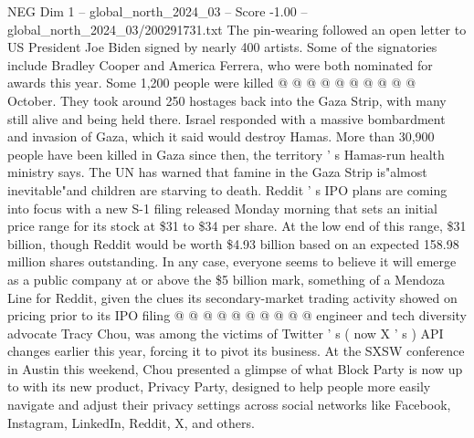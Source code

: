 \begin{textsample}{NEG Dim 1 – global\_north\_2024\_03 – Score -1.00 – global\_north\_2024\_03/200291731.txt}
The pin-wearing followed an open letter to US President Joe Biden signed by nearly 400 artists.
Some of the signatories include Bradley Cooper and America Ferrera, who were both nominated for awards this year.
Some 1,200 people were killed @ @ @ @ @ @ @ @ @ @ October.
They took around 250 hostages back into the Gaza Strip, with many still alive and being held there.
Israel responded with a massive bombardment and invasion of Gaza, which it said would destroy Hamas.
More than 30,900 people have been killed in Gaza since then, the territory ' s Hamas-run health ministry says.
The UN has warned that famine in the Gaza Strip is"almost inevitable"and children are starving to death.
Reddit ' s IPO plans are coming into focus with a new S-1 filing released Monday morning that sets an initial price range for its stock at \$31 to \$34 per share.
At the low end of this range, \$31 billion, though Reddit would be worth \$4.93 billion based on an expected 158.98 million shares outstanding.
In any case, everyone seems to believe it will emerge as a public company at or above the \$5 billion mark, something of a Mendoza Line for Reddit, given the clues its secondary-market trading activity showed on pricing prior to its IPO filing @ @ @ @ @ @ @ @ @ @ engineer and tech diversity advocate Tracy Chou, was among the victims of Twitter ' s ( now X ' s ) API changes earlier this year, forcing it to pivot its business.
At the SXSW conference in Austin this weekend, Chou presented a glimpse of what Block Party is now up to with its new product, Privacy Party, designed to help people more easily navigate and adjust their privacy settings across social networks like Facebook, Instagram, LinkedIn, Reddit, X, and others.

\end{textsample}
